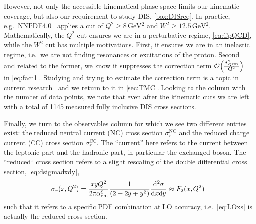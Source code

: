 However, not only the accessible kinematical phase space limits our kinematic coverage, but also our requirement to study DIS, \cref{box:DISreq}.
In practice, e.g.\ NNPDF4.0~\cite{NNPDF:2021njg} applies a cut of $Q^2 \geq \SI{8}{\GeV^2}$ and $W^2 \geq \SI{12.5}{\GeV^2}$.
Mathematically, the $Q^2$ cut ensures we are in a perturbative regime, \cref{eq:CpQCD}, while the $W^2$ cut has multiple motivations.
First, it ensures we are in an inelastic regime, i.e.\ we are not finding resonances or excitations of the proton.
Second and related to the former, we know it suppresses the correction term $\order{\frac{\LQCD^2}{Q^2}}$ in \cref{eq:fact1}.
Studying and trying to estimate the correction term is a topic in current research~\cite{Ball:2025xtj,Harland-Lang:2025wvm,Cerutti:2025yji} and we return to it in \cref{sec:TMC}.
Looking to the column with the number of data points, we note that even after the kinematic cuts we are left with a total of 1145 measured fully inclusive DIS cross sections.

Finally, we turn to the observables column for which we see two different entries exist:
the reduced neutral current (NC) cross section $\sigma_r^\text{NC}$ and the reduced charge current (CC) cross section $\sigma_r^\text{CC}$.
The \enquote{current} here refers to the current between the leptonic part and the hadronic part, in particular the exchanged boson.
The \enquote{reduced} cross section refers to a slight rescaling of the double differential cross section, \cref{eq:dsigmadxdy},
\begin{equation}
    \sigma_r(x,Q^2) = \frac{xy Q^2}{2\pi \alpha_\text{em}^2} \frac 1 {\left(2 - 2y + y^2\right)}\frac{\dd[2] \sigma}{\dd x \dd y} \approx F_2(x,Q^2)
\end{equation}
such that it refers to a specific PDF combination at LO accuracy, i.e.\ \cref{eq:LOxs} is actually the reduced cross section.


